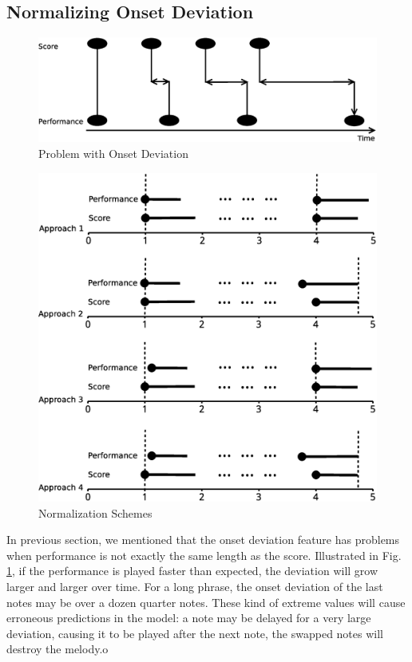    \subsection{Normalizing Onset Deviation}
   \label{sec:normalize}
\begin{figure}[tp]
   \begin{center}
      \includegraphics[width=\textwidth]{fig/prob_onset_diff}

   \end{center}
   \caption{Problem with Onset Deviation }
   \label{fig:normalizationprob}
\end{figure}
\begin{figure}[tp]
   \begin{center}
      \includegraphics[width=\textwidth]{fig/onsetdifffix}

   \end{center}
   \caption{Normalization Schemes}
   \label{fig:normalization}
\end{figure}
In previous section, we mentioned that the onset deviation feature has problems when performance is not exactly the same length as the score. Illustrated in Fig. \ref{fig:normalizationprob}, if the performance is played faster than expected, the deviation will grow larger and larger over time. For a long phrase, the onset deviation of the last notes may be over a dozen quarter notes. These kind of extreme values will cause erroneous predictions in the model: a note may be delayed for a very large deviation, causing it to be played after the next note, the swapped notes will destroy the melody.o
 
